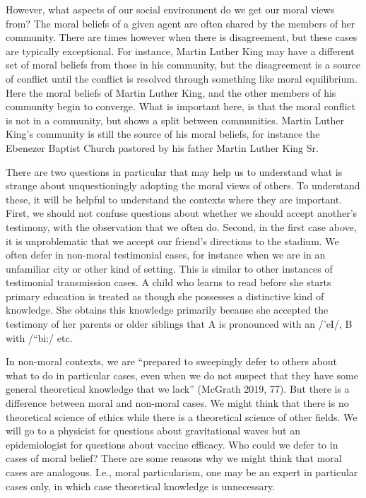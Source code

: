 \documentclass[12pt]{book}
\theoremstyle{definition}
\theoremstyle{remark}
\begin{document}
However, what aspects of our social environment do we get our moral views from? The moral beliefs of a given agent are often shared by the members of her community. There are times however when there is disagreement, but these cases are typically exceptional. For instance, Martin Luther King may have a different set of moral beliefs from those in his community, but the disagreement is a source of conflict until the conflict is resolved through something like moral equilibrium. Here the moral beliefs of Martin Luther King, and the other members of his community begin to converge. What is important here, is that the moral conflict is not in a community, but shows a split between communities. Martin Luther King's community is still the source of his moral beliefs, for instance the Ebenezer Baptist Church pastored by his father Martin Luther King Sr.

There are two questions in particular that may help us to understand what is strange about unquestioningly adopting the moral views of others. To understand these, it will be helpful to understand the contexts where they are important. First, we should not confuse questions about whether we should accept another's testimony, with the observation that we often do. Second, in the first case above, it is unproblematic that we accept our friend's directions to the stadium. We often defer in non-moral testimonial cases, for instance when we are in an unfamiliar city or other kind of setting. This is similar to other instances of testimonial transmission cases. A child who learns to read before she starts primary education is treated as though she possesses a distinctive kind of knowledge. She obtains this knowledge primarily because she accepted the testimony of her parents or older siblings that A is pronounced with an /'eI/, B with /``bi:/ etc.

In non-moral contexts, we are ``prepared to sweepingly defer to others about what to do in particular cases, even when we do not suspect that they have some general theoretical knowledge that we lack'' (McGrath 2019, 77). But there is a difference between moral and non-moral cases. We might think that there is no theoretical science of ethics while there is a theoretical science of other fields. We will go to a physicist for questions about gravitational waves but an epidemiologist for questions about vaccine efficacy. Who could we defer to in cases of moral belief? There are some reasons why we might think that moral cases are analogous. I.e., moral particularism, one may be an expert in particular cases only, in which case theoretical knowledge is unnecessary.
\end{document}
